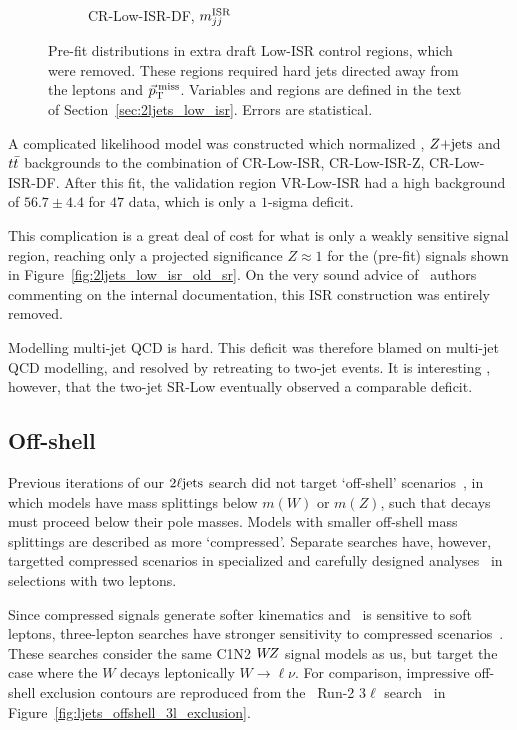 \begin{figure}[tp]
\begin{subfigure}{0.48\textwidth}
\caption{CR-Low-ISR-DF, $m_{jj}^\mathrm{ISR}$}
\end{subfigure}
\caption[
Pre-fit distributions in extra draft Low-ISR control regions, which were
removed
]{%
Pre-fit distributions in extra draft Low-ISR control regions, which were
removed.
These regions required hard jets directed away from the leptons and $\vec p_\mathrm{T}^\mathrm{\:miss}$.
Variables and regions are defined in the text of
Section~\ref{sec:2ljets_low_isr}.
Errors are statistical.
}
\label{fig:2ljets_low_isr_old_more}
\end{figure}

A complicated likelihood model was constructed which normalized \diboson,
$Z\mathrm{+jets}$ and $t\bar t$ backgrounds to the combination of CR-Low-ISR,
CR-Low-ISR-Z, CR-Low-ISR-DF.
After this fit, the validation region VR-Low-ISR had a high background
of $56.7 \pm 4.4$ for $47$ data, which is only a $1$-sigma deficit.

This complication is a great deal of cost for what is only a weakly sensitive
signal region, reaching only a projected significance $Z\approx 1$ for the
(pre-fit) signals shown in Figure~\ref{fig:2ljets_low_isr_old_sr}.
On the very sound advice of \atlas\ authors commenting on the internal
documentation, this ISR construction was entirely removed.

Modelling multi-jet QCD is hard.
This deficit was therefore blamed on multi-jet QCD modelling, and resolved by
retreating to two-jet events.
It is interesting , however, that the two-jet SR-Low eventually observed a
comparable deficit.


\FloatBarrier
\subsection{Off-shell}
\label{sec:2ljets_offshell}
Previous iterations of our $2\ell\mathrm{jets}$ search did not target `off-shell'
scenarios~\cite{atlas_23l_SUSY_2016_24, atlas_2l_SUSY_2013_11}, in which
models have mass splittings below $m(W)$ or $m(Z)$, such that decays must
proceed below their pole masses.
Models with smaller off-shell mass splittings are described as more
`compressed'.
Separate searches have, however, targetted compressed scenarios in
specialized and carefully designed analyses~\cite{
atlas_susy_compressed_2l_2016_partial_run2,
atlas_susy_compressed_2l_2018_run2
} in selections with two leptons.

Since compressed signals generate softer kinematics and \atlas\ is sensitive
to soft leptons, three-lepton searches have stronger sensitivity to
compressed scenarios~\cite{atlas_rjr_3l_SUSY_2019_09}.
These searches consider the same C1N2 $W\kern-0.4exZ$ signal models as us, but target the
case where the $W$ decays leptonically $W\rightarrow\ell\nu$.
For comparison, impressive off-shell exclusion contours are reproduced
from the \atlas\ Run-2 $3\ell$ search~\cite{atlas_rjr_3l_SUSY_2019_09} in
Figure~\ref{fig:ljets_offshell_3l_exclusion}.

